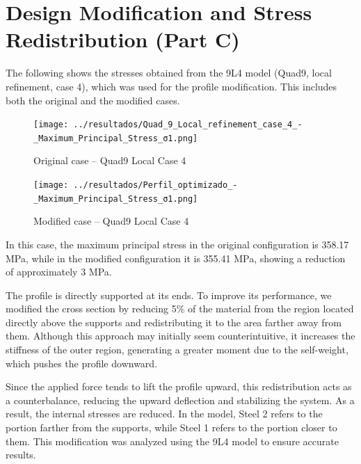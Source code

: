 \documentclass[12pt]{article}
\begin{document}
\newpage
\section{Design Modification and Stress Redistribution (Part C)}

The following shows the stresses obtained from the 9L4 model (Quad9, local refinement, case 4), which was used for the profile modification. This includes both the original and the modified cases.

\begin{figure}[H]
    \centering
    \begin{minipage}{0.48\textwidth}
        \centering
        \texttt{[image: ../resultados/Quad\_9\_Local\_refinement\_case\_4\_-\_Maximum\_Principal\_Stress\_σ1.png]}
        \caption{Original case – Quad9 Local Case 4}
        \label{fig:quad9_local4_original}
    \end{minipage}
    \hfill
    \begin{minipage}{0.48\textwidth}
        \centering
        \texttt{[image: ../resultados/Perfil\_optimizado\_-\_Maximum\_Principal\_Stress\_σ1.png]}
        \caption{Modified case – Quad9 Local Case 4}
        \label{fig:quad9_local4_modified}
    \end{minipage}
\end{figure}

In this case, the maximum principal stress in the original configuration is 358.17 MPa, while in the modified configuration it is 355.41 MPa, showing a reduction of approximately 3 MPa.

The profile is directly supported at its ends. To improve its performance, we modified the cross section by reducing 5\% of the material from the region located directly above the supports and redistributing it to the area farther away from them. Although this approach may initially seem counterintuitive, it increases the stiffness of the outer region, generating a greater moment due to the self-weight, which pushes the profile downward.

Since the applied force tends to lift the profile upward, this redistribution acts as a counterbalance, reducing the upward deflection and stabilizing the system. As a result, the internal stresses are reduced. In the model, Steel 2 refers to the portion farther from the supports, while Steel 1 refers to the portion closer to them. This modification was analyzed using the 9L4 model to ensure accurate results.
\end{document}
